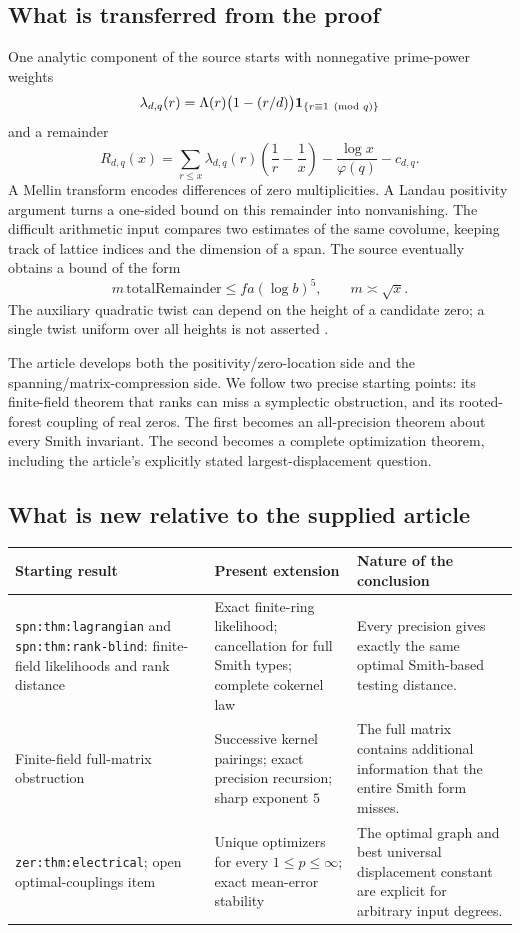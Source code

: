 \subsection{What is transferred from the proof}
One analytic component of the source starts with nonnegative prime-power
weights
\[
 \lambda_{d,q}(r)=\Lambda(r)\bigl(1-(r/d)\bigr)
                       \mathbf 1_{\{r\equiv1\pmod q\}}
\]
and a remainder
\[
 R_{d,q}(x)=\sum_{r\le x}\lambda_{d,q}(r)
                 \left(\frac1r-\frac1x\right)
             -\frac{\log x}{\varphi(q)}-c_{d,q}.
\]
A Mellin transform encodes differences of zero multiplicities. A Landau
positivity argument turns a one-sided bound on this remainder into
nonvanishing. The difficult arithmetic input compares two estimates of
the same covolume, keeping track of lattice indices and the dimension of
a span. The source eventually obtains a bound of the form
\[
 m\,\mathrm{totalRemainder}\le f a(\log b)^5,
 \qquad m\asymp\sqrt{x}.
\]
The auxiliary quadratic twist can depend on the height of a candidate
zero; a single twist uniform over all heights is not asserted
\cite{SourceCriterion,SourceInequality,SourceOneSided}.

The article develops both the positivity/zero-location side and the
spanning/matrix-compression side. We follow two precise starting points:
its finite-field theorem that ranks can miss a symplectic obstruction,
and its rooted-forest coupling of real zeros. The first becomes an
all-precision theorem about every Smith invariant. The second becomes a
complete optimization theorem, including the article's explicitly stated
largest-displacement question.

\subsection{What is new relative to the supplied article}
\begin{center}\small
\begin{tabular}{>{\raggedright\arraybackslash}p{}>{\raggedright\arraybackslash}p{}>{\raggedright\arraybackslash}p{}}
\toprule
Starting result & Present extension & Nature of the conclusion\\
\midrule
\texttt{spn:thm:lagrangian} and
\texttt{spn:thm:rank-blind}: finite-field likelihoods and rank distance
&
Exact finite-ring likelihood; cancellation for full Smith types;
complete cokernel law
&
Every precision gives exactly the same optimal Smith-based
testing distance.\\[.7em]
Finite-field full-matrix obstruction
&
Successive kernel pairings; exact precision recursion;
sharp exponent \(5\)
&
The full matrix contains additional information that the entire
Smith form misses.\\[.7em]
\texttt{zer:thm:electrical}; open optimal-couplings item
&
Unique optimizers for every \(1\le p\le\infty\);
exact mean-error stability
&
The optimal graph and best universal displacement constant
are explicit for arbitrary input degrees.\\
\bottomrule
\end{tabular}
\end{center}


